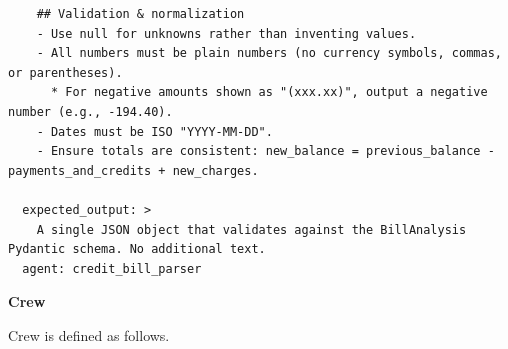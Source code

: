 \begin{lstlisting}
    ## Validation & normalization
    - Use null for unknowns rather than inventing values.
    - All numbers must be plain numbers (no currency symbols, commas, or parentheses).
      * For negative amounts shown as "(xxx.xx)", output a negative number (e.g., -194.40).
    - Dates must be ISO "YYYY-MM-DD".
    - Ensure totals are consistent: new_balance = previous_balance - payments_and_credits + new_charges.

  expected_output: >
    A single JSON object that validates against the BillAnalysis Pydantic schema. No additional text.
  agent: credit_bill_parser
\end{lstlisting}

\vspace{0.1in}
\noindent \textbf{Crew}
\vspace{0.1in}

Crew is defined as follows.

